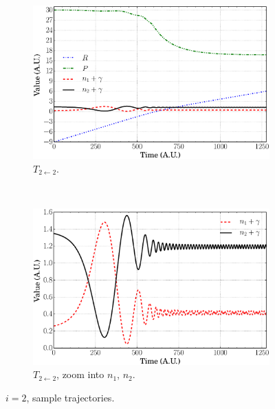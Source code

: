 \documentclass[xetex,mathserif,serif]{beamer}
\newcommand{\ttt}{$ T_{2\leftarrow2} $}
\begin{document}
\begin{frame}
{\begin{figure}
\begin{subfigure}[t]{0.45\textwidth}
\includegraphics[width=\textwidth]{ec_traj_t22.eps}
\vspace{-0.1cm}
\caption{{\fontsize{7}{8}\selectfont \ttt.}}
\end{subfigure}
~
\begin{subfigure}[t]{0.45\textwidth}
\centering
\includegraphics[width=\textwidth]{ec_traj_t22_e.eps}
\vspace{-0.1cm}
\caption{{\fontsize{7}{8}\selectfont \ttt, zoom into $ n_{1}$, $n_{2} $.}}
\end{subfigure}
\vspace{-0.1cm}
\caption{$ i = 2 $, sample trajectories.}
\end{figure}
}{}
\end{frame}
\end{document}
